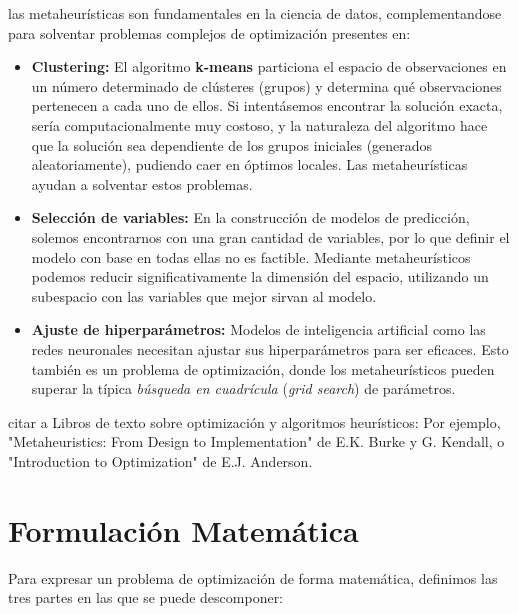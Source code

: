 \documentclass[12pt,a4paper]{book}
\begin{document}
las metaheurísticas son fundamentales en la ciencia de datos, complementandose para solventar problemas complejos de optimización presentes en:
\begin{itemize}
    \item \textbf{Clustering:} El algoritmo \textbf{k-means} particiona el espacio de observaciones en un número determinado de clústeres (grupos) y determina qué observaciones pertenecen a cada uno de ellos. 
    Si intentásemos encontrar la solución exacta, sería computacionalmente muy costoso, y la naturaleza del algoritmo hace que la solución sea dependiente de los grupos iniciales (generados aleatoriamente), pudiendo caer en óptimos locales.
    Las metaheurísticas ayudan a solventar estos problemas.
    
    \item \textbf{Selección de variables:} En la construcción de modelos de predicción, solemos encontrarnos con una gran cantidad de variables, por lo que definir el modelo con base en todas ellas no es factible. Mediante metaheurísticos podemos 
    reducir significativamente la dimensión del espacio, utilizando un subespacio con las variables que mejor sirvan al modelo.
    
    \item \textbf{Ajuste de hiperparámetros:} Modelos de inteligencia artificial como las redes neuronales necesitan ajustar sus hiperparámetros para ser eficaces. Esto también es un problema de optimización, donde los metaheurísticos pueden superar la típica \textit{búsqueda en cuadrícula} (\textit{grid search}) de parámetros.
\end{itemize}

\color{red} citar a Libros de texto sobre optimización y algoritmos heurísticos: Por ejemplo, "Metaheuristics: From Design to Implementation" de E.K. Burke y G. Kendall, o "Introduction to Optimization" de E.J. Anderson. \color{black}

\section{Formulación Matemática}

Para expresar un problema de optimización de forma matemática, definimos las tres partes en las que se puede descomponer:
\end{document}

